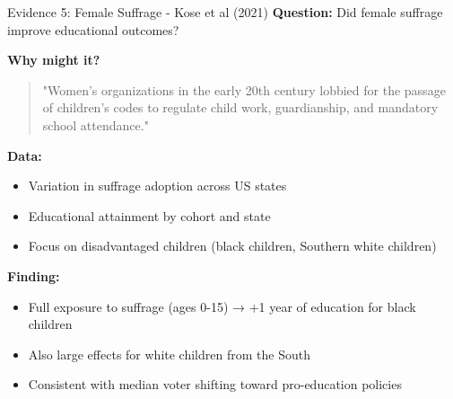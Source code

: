 \documentclass[10pt]{beamer}
\begin{document}
\begin{frame}[allowframebreaks]{Evidence 5: Female Suffrage - Kose et al (2021)}
\textbf{Question:} Did female suffrage improve educational outcomes?



\textbf{Why might it?}
\begin{quote}
"Women's organizations in the early 20th century lobbied for the passage of children's codes to regulate child work, guardianship, and mandatory school attendance."
\end{quote}



\textbf{Data:}
\begin{itemize}
\item Variation in suffrage adoption across US states
\item Educational attainment by cohort and state
\item Focus on disadvantaged children (black children, Southern white children)
\end{itemize}


\framebreak
\textbf{Finding:}
\begin{itemize}
\item Full exposure to suffrage (ages 0-15) → \alert{+1 year of education} for black children
\item Also large effects for white children from the South
\item \alert{Consistent with median voter shifting toward pro-education policies}
\end{itemize}
\end{frame}
\end{document}
